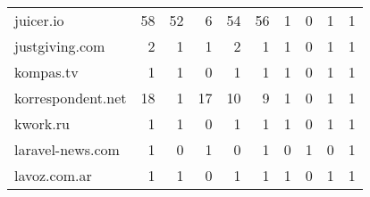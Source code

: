 \begin{tabular}{lrrrrrrrrr}
                  juicer.io &                               58 &                                 52 &                                      6 &                           54 &                          56 &                                   1 &                                      0 &                             1 &                            1 \\
             justgiving.com &                                2 &                                  1 &                                      1 &                            2 &                           1 &                                   1 &                                      0 &                             1 &                            1 \\
                  kompas.tv &                                1 &                                  1 &                                      0 &                            1 &                           1 &                                   1 &                                      0 &                             1 &                            1 \\
          korrespondent.net &                               18 &                                  1 &                                     17 &                           10 &                           9 &                                   1 &                                      0 &                             1 &                            1 \\
                   kwork.ru &                                1 &                                  1 &                                      0 &                            1 &                           1 &                                   1 &                                      0 &                             1 &                            1 \\
           laravel-news.com &                                1 &                                  0 &                                      1 &                            0 &                           1 &                                   0 &                                      1 &                             0 &                            1 \\
               lavoz.com.ar &                                1 &                                  1 &                                      0 &                            1 &                           1 &                                   1 &                                      0 &                             1 &                            1 \\

\end{tabular}
